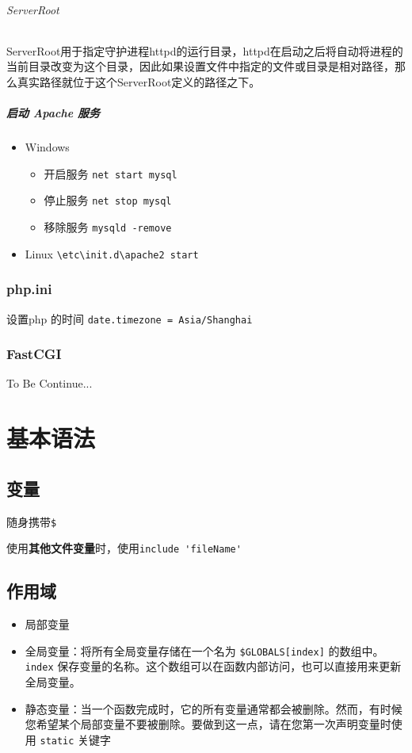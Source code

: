 \documentclass[UTF8,a4paper,12pt]{ctexbook}
\begin{document}
	 			\subparagraph{ServerRoot}
	 				ServerRoot用于指定守护进程httpd的运行目录，httpd在启动之后将自动将进程的当前目录改变为这个目录，因此如果设置文件中指定的文件或目录是相对路径，那么真实路径就位于这个ServerRoot定义的路径之下。 
	 				
	 		\paragraph{启动 Apache 服务}	
	 			\begin{itemize}
	 				\item Windows
	 					\begin{itemize}
	 						\item 开启服务 \verb|net start mysql|
	 						\item 停止服务 \verb|net stop mysql|
	 						\item 移除服务 \verb|mysqld -remove|
	 					\end{itemize}
	 				\item Linux
	 					\verb|\etc\init.d\apache2 start|
	 			\end{itemize}
	 			
 		\subsection{php.ini}	
 			设置php 的时间 \verb|date.timezone = Asia/Shanghai|

 		\subsection{FastCGI}
 		 	To Be Continue...	
 		 		
\chapter{基本语法}
	\section{变量}
		随身携带\verb|$|
		
		使用\textbf{其他文件变量}时，使用\verb|include 'fileName'|
		
	\section{作用域}
		\begin{itemize}
			\item 局部变量
			\item 全局变量：将所有全局变量存储在一个名为 \verb|$GLOBALS[index]| 的数组中。 \verb|index| 保存变量的名称。这个数组可以在函数内部访问，也可以直接用来更新全局变量。
			\item 静态变量：当一个函数完成时，它的所有变量通常都会被删除。然而，有时候您希望某个局部变量不要被删除。要做到这一点，请在您第一次声明变量时使用 \verb|static| 关键字
		\end{itemize}
	
\end{document}
